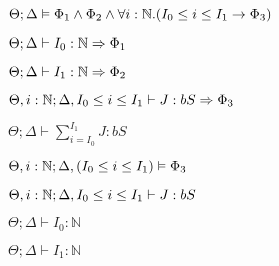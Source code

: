 {{{     $\Theta ; \Delta \vDash \Phi_1 \wedge \Phi_2 \wedge \forall i : \mathbb{N}.(I_0 \leq i \leq I_1 \to \Phi_3)$
    
     $\Theta;\Delta \vdash I_0 : \mathbb{N} \Rightarrow \Phi_1$
    
      $\Theta;\Delta \vdash I_1 : \mathbb{N} \Rightarrow \Phi_2$
    
     $\Theta,i : \mathbb{N};\Delta, I_0 \leq i \leq I_1 \vdash J : bS \Rightarrow \Phi_3$
  }{
     $\Theta;\Delta \vdash \sum_{i=I_0}^{I_1} J : bS$
  }
  
  
   $\Theta, i : \mathbb{N} ; \Delta, (I_0 \leq i \leq I_1) \vDash \Phi_3$
  
  
   $\Theta,i : \mathbb{N};\Delta, I_0 \leq i \leq I_1 \vdash J : bS$
  
  
   $\Theta;\Delta \vdash I_0 : \mathbb{N}$
  
  
   $\Theta;\Delta \vdash I_1 : \mathbb{N}$
  
}


}